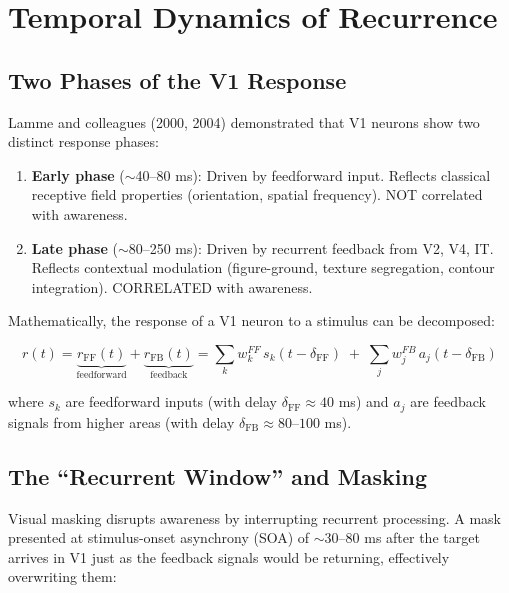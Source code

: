 \documentclass[11pt,a4paper]{report}
\begin{document}
\section{Temporal Dynamics of Recurrence}

\subsection{Two Phases of the V1 Response}

Lamme and colleagues (2000, 2004) demonstrated that V1 neurons show two distinct response phases:

\begin{enumerate}[leftmargin=2em]
  \item \textbf{Early phase} ($\sim$40--80 ms): Driven by feedforward input. Reflects classical receptive field properties (orientation, spatial frequency). NOT correlated with awareness.
  \item \textbf{Late phase} ($\sim$80--250 ms): Driven by recurrent feedback from V2, V4, IT. Reflects contextual modulation (figure-ground, texture segregation, contour integration). CORRELATED with awareness.
\end{enumerate}

Mathematically, the response of a V1 neuron to a stimulus can be decomposed:

\begin{mathbox}
\vspace{-6pt}
\[
  r(t) = \underbrace{r_{\text{FF}}(t)}_{\text{feedforward}} + \underbrace{r_{\text{FB}}(t)}_{\text{feedback}} = \sum_{k} w_k^{FF}\, s_k(t - \delta_{\text{FF}}) \;+\; \sum_{j} w_j^{FB}\, a_j(t - \delta_{\text{FB}})
\]
\vspace{-8pt}
\end{mathbox}

where $s_k$ are feedforward inputs (with delay $\delta_{\text{FF}} \approx 40$ ms) and $a_j$ are feedback signals from higher areas (with delay $\delta_{\text{FB}} \approx 80$--$100$ ms).

\subsection{The ``Recurrent Window'' and Masking}

Visual masking disrupts awareness by interrupting recurrent processing. A mask presented at stimulus-onset asynchrony (SOA) of $\sim$30--80 ms after the target arrives in V1 just as the feedback signals would be returning, effectively overwriting them:
\end{document}

